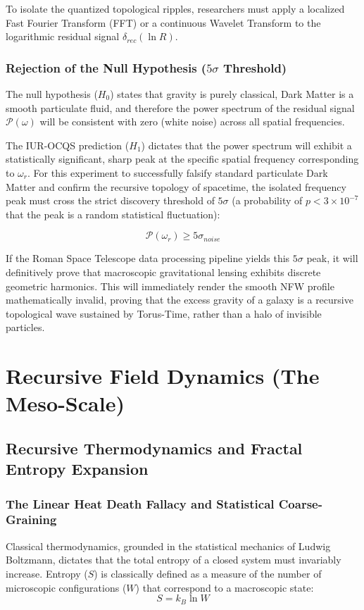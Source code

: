 \documentclass[12pt,openany]{book}
\begin{document}
To isolate the quantized topological ripples, researchers must apply a localized Fast Fourier Transform (FFT) or a continuous Wavelet Transform to the logarithmic residual signal $\delta_{rec}(\ln R)$.

\section{Rejection of the Null Hypothesis ($5\sigma$ Threshold)}
The null hypothesis ($H_0$) states that gravity is purely classical, Dark Matter is a smooth particulate fluid, and therefore the power spectrum of the residual signal $\mathcal{P}(\omega)$ will be consistent with zero (white noise) across all spatial frequencies.

The IUR-OCQS prediction ($H_1$) dictates that the power spectrum will exhibit a statistically significant, sharp peak at the specific spatial frequency corresponding to $\omega_r$. For this experiment to successfully falsify standard particulate Dark Matter and confirm the recursive topology of spacetime, the isolated frequency peak must cross the strict discovery threshold of $5\sigma$ (a probability of $p < 3 \times 10^{-7}$ that the peak is a random statistical fluctuation):

\begin{equation}
\mathcal{P}(\omega_r) \ge 5\sigma_{noise}
\end{equation}

If the Roman Space Telescope data processing pipeline yields this $5\sigma$ peak, it will definitively prove that macroscopic gravitational lensing exhibits discrete geometric harmonics. This will immediately render the smooth NFW profile mathematically invalid, proving that the excess gravity of a galaxy is a recursive topological wave sustained by Torus-Time, rather than a halo of invisible particles.

\part{Recursive Field Dynamics (The Meso-Scale)}

\chapter[Recursive Thermodynamics]{Recursive Thermodynamics and Fractal Entropy Expansion}

\section{The Linear Heat Death Fallacy and Statistical Coarse-Graining}
Classical thermodynamics, grounded in the statistical mechanics of Ludwig Boltzmann, dictates that the total entropy of a closed system must invariably increase. Entropy ($S$) is classically defined as a measure of the number of microscopic configurations ($W$) that correspond to a macroscopic state:
\begin{equation}
    S = k_B \ln W
\end{equation}
\end{document}
